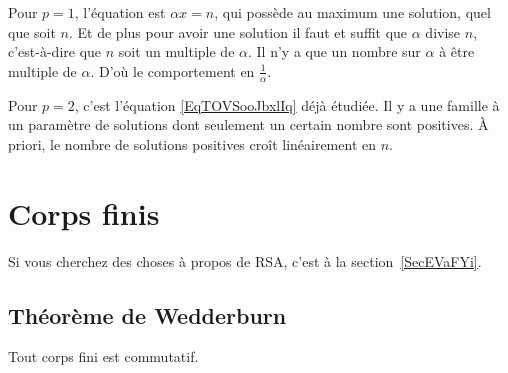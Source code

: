 \begin{example}
    Pour \( p=1\), l'équation est \( \alpha x=n\), qui possède au maximum une solution, quel que soit \( n\). Et de plus pour avoir une solution il faut et suffit que \( \alpha\) divise \( n\), c'est-à-dire que \( n\) soit un multiple de \( \alpha\). Il n'y a que un nombre sur \( \alpha\) à être multiple de \( \alpha\). D'où le comportement en \( \frac{1}{ \alpha }\).

    Pour \( p=2\), c'est l'équation \eqref{EqTOVSooJbxlIq} déjà étudiée. Il y a une famille à un paramètre de solutions dont seulement un certain nombre sont positives. À priori, le nombre de solutions positives croît linéairement en \( n\).
\end{example}


\section{Corps finis}
\label{SecCorpsFinizkAcbS}

Si vous cherchez des choses à propos de RSA, c'est à la section~\ref{SecEVaFYi}.

\subsection{Théorème de Wedderburn}

\begin{theorem}    \label{ThoMncIWA}
    Tout corps fini est commutatif.
\end{theorem}

